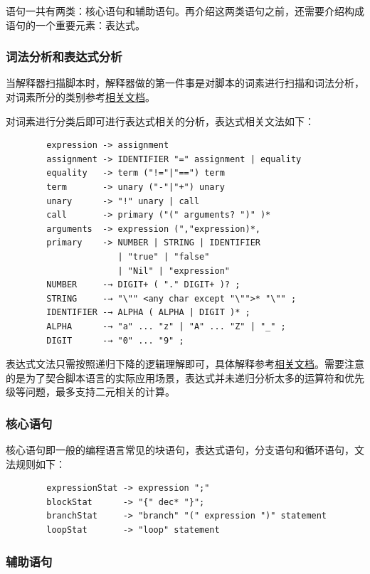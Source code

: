 \documentclass[12pt]{article}
\begin{document}
    语句一共有两类：核心语句和辅助语句。再介绍这两类语句之前，还需要介绍构成语句的一个重要元素：表达式。

    \subsubsection{词法分析和表达式分析}

    当解释器扫描脚本时，解释器做的第一件事是对脚本的词素进行扫描和词法分析，对词素所分的类别参考\href{generate_by_cargo/robot_dsl/token/enum.TokenType.html}{相关文档}。

    对词素进行分类后即可进行表达式相关的分析，表达式相关文法如下：

    \begin{verbatim}
        expression -> assignment
        assignment -> IDENTIFIER "=" assignment | equality
        equality   -> term ("!="|"==") term
        term       -> unary ("-"|"+") unary
        unary      -> "!" unary | call
        call       -> primary ("(" arguments? ")" )*
        arguments  -> expression (","expression)*,
        primary    -> NUMBER | STRING | IDENTIFIER 
                      | "true" | "false" 
                      | "Nil" | "expression"   
        NUMBER     -→ DIGIT+ ( "." DIGIT+ )? ;
        STRING     -→ "\"" <any char except "\"">* "\"" ;
        IDENTIFIER -→ ALPHA ( ALPHA | DIGIT )* ;
        ALPHA      -→ "a" ... "z" | "A" ... "Z" | "_" ;
        DIGIT      -→ "0" ... "9" ;
    \end{verbatim}

    表达式文法只需按照递归下降的逻辑理解即可，具体解释参考\href{generate_by_cargo/robot_dsl/syntax/enum.Expr.html}{相关文档}。需要注意的是为了契合脚本语言的实际应用场景，表达式并未递归分析太多的运算符和优先级等问题，最多支持二元相关的计算。

    \subsubsection{核心语句}

    核心语句即一般的编程语言常见的块语句，表达式语句，分支语句和循环语句，文法规则如下：

    \begin{verbatim}
        expressionStat -> expression ";"
        blockStat      -> "{" dec* "}";
        branchStat     -> "branch" "(" expression ")" statement
        loopStat       -> "loop" statement
    \end{verbatim}

    \subsubsection{辅助语句}
\end{document}
